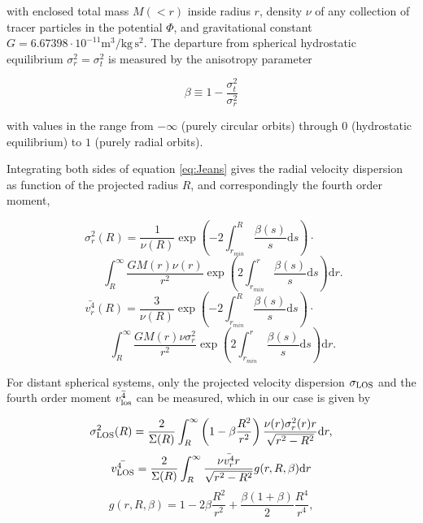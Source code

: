 with enclosed total mass $M(<r)$ inside radius $r$, density $\nu$ of
any collection of tracer particles in the potential $\Phi$, and
gravitational constant $G = 6.67398\cdot10^{-11}
\text{m}^3/\text{kg}\,\text{s}^2$. The departure from spherical
hydrostatic equilibrium $\sigma_r^2=\sigma_t^2$ is measured by the
anisotropy parameter

\begin{equation}
\beta \equiv 1-\frac{\sigma_t^2}{\sigma_r^2}
\end{equation}

with values in the range from $-\infty$ (purely circular orbits)
through $0$ (hydrostatic equilibrium) to $1$ (purely radial orbits).

Integrating both sides of equation \ref{eq:Jeans} gives the radial
velocity dispersion as function of the projected radius $R$, and
correspondingly the fourth order moment,

\begin{equation}\label{eq:main}
    \sigma_r^2(R) = \frac{1}{\nu(R)}\exp\left(-2\int_{r_{min}}^{R}\frac{\beta(s)}{s}\text{d}s\right)\cdot\qquad
\end{equation}
\begin{equation*}
    \qquad\int_R^\infty \frac{GM(r)\nu(r)}{r^2} \exp\left(2\int_{r_{min}}^r\frac{\beta(s)}{s}\text{d}s\right)\text{d}r.
\end{equation*}
\begin{equation*}
    \bar{v_r^4}(R) = \frac{3}{\nu(R)}\exp\left(-2\int_{r_{min}}^{R}\frac{\beta(s)}{s}\text{d}s\right)\cdot\qquad
\end{equation*}
\begin{equation*}
    \qquad\int_R^\infty \frac{GM(r)\nu\sigma_r^2}{r^2} \exp\left(2\int_{r_{min}}^r\frac{\beta(s)}{s}\text{d}s\right)\text{d}r.
\end{equation*}

For distant spherical systems, only the projected velocity dispersion
$\sigma_{\text{LOS}}$ and the fourth order moment $\bar{v_{\rm los}^4}$ can be
measured, which in our case is given by

\begin{equation}\label{eq:LOS}
    \sigma_{\text{LOS}}^2(R) = \frac{2}{\Sigma(R)}\int_R^\infty \left(1-\beta\frac{R^2}{r^2}\right) \frac{\nu(r)\sigma_r^2(r) r}{\sqrt{r^2-R^2}}\text{d}r,
\end{equation}
\begin{equation}\label{eq:kappa}
    \bar{v_{\rm LOS}^4} = \frac{2}{\Sigma(R)}\int_R^\infty\frac{\nu \bar{v_r^4}r}{\sqrt{r^2-R^2}}g(r,R,\beta)\text{d}r
\end{equation}
\begin{equation*}
    g(r,R,\beta) = 1-2\beta\frac{R^2}{r^2}+\frac{\beta(1+\beta)}{2}\frac{R^4}{r^4},
\end{equation*}

